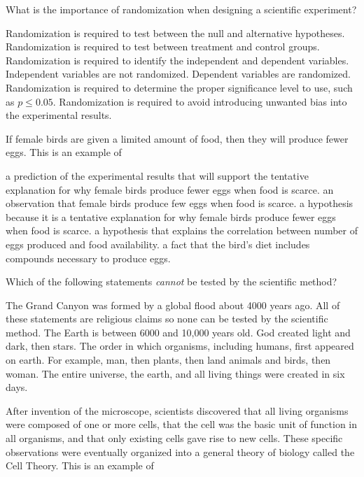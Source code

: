 
\question
What is the importance of randomization when designing a scientific experiment?

\begin{choices}
\choice Randomization is required to test between the null and alternative hypotheses.
\choice Randomization is required to test between treatment and control groups.
\choice Randomization is required to identify the independent and dependent variables. Independent variables are not randomized. Dependent variables are randomized.
\choice Randomization is required to determine the proper significance level to use, such as $p \le 0.05$.
\correctchoice Randomization is required to avoid introducing unwanted bias into the experimental results.
\end{choices}

\question
If female birds are given a limited amount of food, then they will produce fewer eggs.  This is an example of

\begin{choices}
\correctchoice a prediction of the experimental results that will support the tentative explanation for why female birds produce fewer eggs when food is scarce.
\choice an observation that female birds produce few eggs when food is scarce.
\choice a hypothesis because it is a tentative explanation for why female birds produce fewer eggs when food is scarce.
\choice a hypothesis that explains the correlation between number of eggs produced and food availability.
\choice a fact that the bird's diet includes compounds necessary to produce eggs.
\end{choices}

\question
Which of the following statements \emph{cannot} be tested by the scientific method?

\begin{choices}
\choice The Grand Canyon was formed by a global flood about 4000 years ago.
\choice All of these statements are religious claims so none can be tested by the scientific method.
\choice The Earth is between 6000 and 10,000 years old.
\correctchoice God created light and dark, then stars.
\choice The order in which organisms, including humans, first appeared on earth. For example, man, then plants, then land animals and birds, then woman.
\choice The entire universe, the earth, and all living things were created in six days.
\end{choices}

\question
After invention of the microscope, scientists discovered that all living organisms were composed of one or more cells, that the cell was the basic unit of function in all organisms, and that only existing cells gave rise to new cells. These specific observations were eventually organized into a general theory of biology called the Cell Theory. This is an example of 


